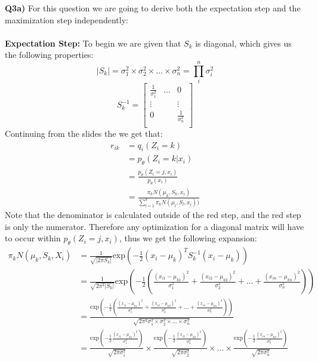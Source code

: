 \documentclass{article}
\begin{document}
\begin{titlepage}
\vspace{0.5cm}
\textbf{Q3a)} For this question we are going to derive both the expectation step and the maximization step independently: \\\\
\textbf{Expectation Step: } To begin we are given that $S_k$ is diagonal, which gives us the following properties:
\[ |S_k| = \sigma_1^2 \times \sigma_2^2 \times ... \times \sigma_n^2 = \prod_i^n \sigma_i^2 \]
\[ S_k^{-1} = \begin{bmatrix}
\frac{1}{\sigma_1^2} & ... & 0 \\
\vdots & & \vdots \\
0 & & \frac{1}{\sigma_n^2} \\
\end{bmatrix} \]
Continuing from the slides the we get that:
\begin{align*}
r_{ik} &= q_i(Z_i = k) \\
&= p_{\theta}(Z_i = k | x_i) \\
&= \frac{ p_{\theta} (Z_i = j, x_i)} { p_{\theta}(x_i)} \\
&= \frac{ \pi_k N(\mu_k, S_k, x_i) } { \sum^k_{l=1} \pi_k N(\mu_l, S_l, x_i))}
\end{align*}
Note that the denominator is calculated outside of the red step, and the red step is only the numerator. Therefore any optimization for a diagonal matrix will have to occur within $p_{\theta} (Z_i = j, x_i)$, thus we get the following expansion:
\begin{align*}
\pi_k N(\mu_k, S_k, X_i) &= \frac{1}{\sqrt{ \lvert 2\pi S_k \rvert }} \text{exp}\left( - \frac{1}{2}(x_i - \mu_k)^T S_k^{-1}(x_i - \mu_k) \right) \\
&= \frac{1}{\sqrt{  2\pi^k  \lvert S_k \rvert }} \text{exp}\left( - \frac{1}{2} \left( \frac{(x_{i1}-\mu_{k1})^2}{\sigma_1^2} + \frac{(x_{i2}-\mu_{k2})^2}{\sigma_2^2} + ... + \frac{(x_{in}-\mu_{kn})^2}{\sigma_n^2}  \right) \right) \\
&= \frac{\text{exp}\left( - \frac{1}{2} \left( \frac{(x_{i1}-\mu_{k1})^2}{\sigma_1^2} + \frac{(x_{i2}-\mu_{k2})^2}{\sigma_2^2} + ... + \frac{(x_{in}-\mu_{kn})^2}{\sigma_n^2}  \right) \right)}{\sqrt{  2\pi^k  \sigma_1^2 \times \sigma_2^2 \times ... \times \sigma_n^2}} \\
&= \frac{\text{exp}\left( - \frac{1}{2} \frac{(x_{i1}-\mu_{k1})^2}{\sigma_1^2} \right)}{\sqrt{  2\pi  \sigma_1^2}} \times \frac{\text{exp}\left( - \frac{1}{2} \frac{(x_{i2}-\mu_{k2})^2}{\sigma_2^2} \right)}{\sqrt{  2\pi  \sigma_2^2}} \times ... \times \frac{\text{exp}\left( - \frac{1}{2} \frac{(x_{in}-\mu_{kn})^2}{\sigma_n^2} \right)}{\sqrt{  2\pi  \sigma_n^2}}\\

\end{align*}
\end{titlepage}
\end{document}
